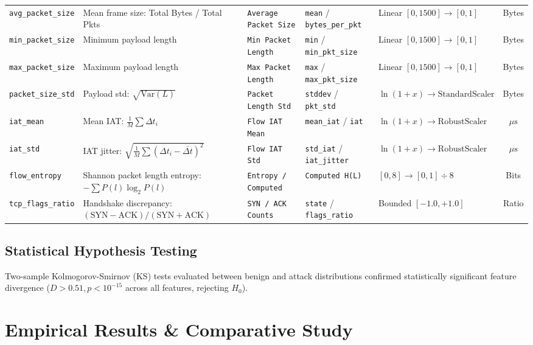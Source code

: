 \documentclass[journal]{IEEEtran}
\begin{document}
\begin{table}[t]
\begin{tabular}{lllllc}
\texttt{avg\_packet\_size} & Mean frame size: Total Bytes / Total Pkts & \texttt{Average Packet Size} & \texttt{mean} / \texttt{bytes\_per\_pkt} & Linear $[0, 1500] \to [0, 1]$ & Bytes \\
\texttt{min\_packet\_size} & Minimum payload length & \texttt{Min Packet Length} & \texttt{min} / \texttt{min\_pkt\_size} & Linear $[0, 1500] \to [0, 1]$ & Bytes \\
\texttt{max\_packet\_size} & Maximum payload length & \texttt{Max Packet Length} & \texttt{max} / \texttt{max\_pkt\_size} & Linear $[0, 1500] \to [0, 1]$ & Bytes \\
\texttt{packet\_size\_std} & Payload std: $\sqrt{\text{Var}(L)}$ & \texttt{Packet Length Std} & \texttt{stddev} / \texttt{pkt\_std} & $\ln(1 + x) \to \text{StandardScaler}$ & Bytes \\
\texttt{iat\_mean} & Mean IAT: $\frac{1}{M}\sum \Delta t_i$ & \texttt{Flow IAT Mean} & \texttt{mean\_iat} / \texttt{iat} & $\ln(1 + x) \to \text{RobustScaler}$ & $\mu\text{s}$ \\
\texttt{iat\_std} & IAT jitter: $\sqrt{\frac{1}{M}\sum (\Delta t_i - \bar{\Delta t})^2}$ & \texttt{Flow IAT Std} & \texttt{std\_iat} / \texttt{iat\_jitter} & $\ln(1 + x) \to \text{RobustScaler}$ & $\mu\text{s}$ \\
\texttt{flow\_entropy} & Shannon packet length entropy: $-\sum P(l)\log_2 P(l)$ & \texttt{Entropy / Computed} & \texttt{Computed H(L)} & $[0, 8] \to [0, 1] \div 8$ & Bits \\
\texttt{tcp\_flags\_ratio} & Handshake discrepancy: $(\text{SYN}-\text{ACK})/(\text{SYN}+\text{ACK})$ & \texttt{SYN / ACK Counts} & \texttt{state} / \texttt{flags\_ratio} & Bounded $[-1.0, +1.0]$ & Ratio \\
\bottomrule
\end{tabular}
\end{table}

\subsection{Statistical Hypothesis Testing}
Two-sample Kolmogorov-Smirnov (KS) tests evaluated between benign and attack distributions confirmed statistically significant feature divergence ($D > 0.51, p < 10^{-15}$ across all features, rejecting $H_0$).

\section{Empirical Results \& Comparative Study}
\end{document}

